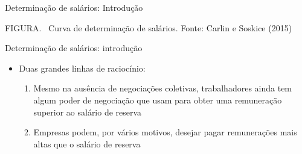 \documentclass[10pt]{beamer}
\begin{document}
\begin{frame}{Determinação de salários: Introdução}
    \begin{center}
		\begin{minipage}[b]{.8\textwidth}
			\tiny{{\scshape FIGURA}. \ Curva de determinação de salários. Fonte: Carlin e Soskice (2015)} 
		\end{minipage}
	\end{center}
\end{frame}

\begin{frame}
    {Determinação de salários: introdução}
    \begin{itemize}
        \item Duas grandes linhas de raciocínio:\medskip
        \begin{enumerate}
            \item Mesmo na ausência de negociações coletivas, trabalhadores ainda tem algum poder de negociação que usam para obter uma remuneração superior ao salário de reserva\medskip
            \item Empresas podem, por vários motivos, desejar pagar remunerações mais altas que o salário de reserva
        \end{enumerate}
    \end{itemize}
\end{frame}
\end{document}
